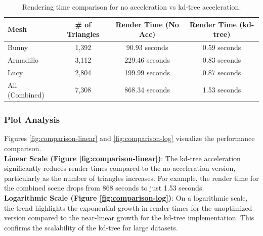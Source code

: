 \documentclass[unicode,11pt,a4paper,oneside,numbers=endperiod,openany]{scrartcl}
\begin{document}
\begin{table}[H]
    \centering
    \begin{tabular}{lccc}
        \toprule
        \textbf{Mesh}  & \textbf{\# of Triangles} & \textbf{Render Time (No Acc)} & \textbf{Render Time (kd-tree)} \\
        \midrule
        Bunny          & 1,392                    & 90.93 seconds                 & 0.59 seconds                   \\
        Armadillo      & 3,112                    & 229.46 seconds                & 0.83 seconds                   \\
        Lucy           & 2,804                    & 199.99 seconds                & 0.87 seconds                   \\
        All (Combined) & 7,308                    & 868.34 seconds                & 1.53 seconds                   \\
        \bottomrule
    \end{tabular}
    \caption{Rendering time comparison for no acceleration vs kd-tree acceleration.}
    \label{tab:results}
\end{table}

\subsubsection*{Plot Analysis}
Figures \ref{fig:comparison-linear} and \ref{fig:comparison-log} visualize the performance comparison.
\\
\textbf{Linear Scale (Figure \ref{fig:comparison-linear})}: The kd-tree acceleration significantly reduces render times compared to the no-acceleration version, particularly as the number of triangles increases. For example, the render time for the combined scene drops from 868 seconds to just 1.53 seconds.
\\
\textbf{Logarithmic Scale (Figure \ref{fig:comparison-log})}: On a logarithmic scale, the trend highlights the exponential growth in render times for the unoptimized version compared to the near-linear growth for the kd-tree implementation. This confirms the scalability of the kd-tree for large datasets.
\end{document}

